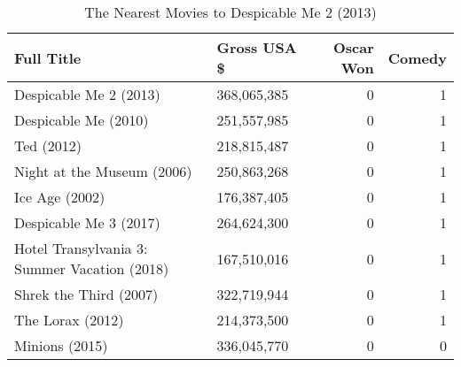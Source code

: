 \begin{table}[H]
\centering
\begin{tabular}{llrr}
  \hline
Full Title & Gross USA \$ & Oscar Won & Comedy \\ 
  \hline
Despicable Me 2 (2013) & 368,065,385 &   0 &   1 \\ 
  Despicable Me (2010) & 251,557,985 &   0 &   1 \\ 
  Ted (2012) & 218,815,487 &   0 &   1 \\ 
  Night at the Museum (2006) & 250,863,268 &   0 &   1 \\ 
  Ice Age (2002) & 176,387,405 &   0 &   1 \\ 
  Despicable Me 3 (2017) & 264,624,300 &   0 &   1 \\ 
  Hotel Transylvania 3: Summer Vacation (2018) & 167,510,016 &   0 &   1 \\ 
  Shrek the Third (2007) & 322,719,944 &   0 &   1 \\ 
  The Lorax (2012) & 214,373,500 &   0 &   1 \\ 
  Minions (2015) & 336,045,770 &   0 &   0 \\ 
   \hline
\end{tabular}
\caption{The Nearest Movies to Despicable Me 2 (2013)} 
\end{table}

